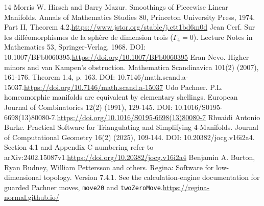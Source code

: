\documentclass[11pt,letterpaper]{article}
\begin{document}
\begin{thebibliography}{14}
 Morris W. Hirsch and Barry Mazur. Smoothings of Piecewise Linear Manifolds. Annals of Mathematics Studies 80, Princeton University Press, 1974. Part II, Theorem 4.2.\newline\url{https://www.jstor.org/stable/j.ctt1bd6m0d}
 Jean Cerf. Sur les difféomorphismes de la sphère de dimension trois ($\Gamma_4=0$). Lecture Notes in Mathematics 53, Springer-Verlag, 1968. DOI: 10.1007/BFb0060395.\newline\url{https://doi.org/10.1007/BFb0060395}
 Eran Nevo. Higher minors and van Kampen's obstruction. Mathematica Scandinavica 101(2) (2007), 161-176. Theorem 1.4, p. 163. DOI: 10.7146/math.scand.a-15037.\newline\url{https://doi.org/10.7146/math.scand.a-15037}
 Udo Pachner. P.L. homeomorphic manifolds are equivalent by elementary shellings. European Journal of Combinatorics 12(2) (1991), 129-145. DOI: 10.1016/S0195-6698(13)80080-7.\newline\url{https://doi.org/10.1016/S0195-6698(13)80080-7}
 Rhuaidi Antonio Burke. Practical Software for Triangulating and Simplifying 4-Manifolds. Journal of Computational Geometry 16(2) (2025), 109-144. DOI: 10.20382/jocg.v16i2a4. Section 4.1 and Appendix C numbering refer to arXiv:2402.15087v1.\newline\url{https://doi.org/10.20382/jocg.v16i2a4}
 Benjamin A. Burton, Ryan Budney, William Pettersson and others. Regina: Software for low-dimensional topology. Version 7.4.1. See the calculation-engine documentation for guarded Pachner moves, {\small\texttt{move20}} and {\small\texttt{twoZeroMove}}.\newline\url{https://regina-normal.github.io/}
\end{thebibliography}
\end{document}
